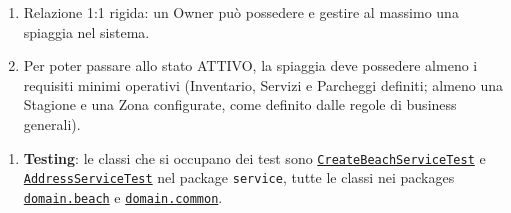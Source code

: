 {
	\begin{enumerate}[nosep, leftmargin=*]
		\item[•] Relazione 1:1 rigida: un Owner può possedere e gestire al massimo una spiaggia nel sistema.
		\item[•] Per poter passare allo stato ATTIVO, la spiaggia deve possedere almeno i requisiti minimi operativi (Inventario, Servizi e Parcheggi definiti; almeno una Stagione e una Zona configurate, come definito dalle regole di business generali).
	\end{enumerate}
	
	\begin{enumerate}[leftmargin=*]
		\item[•] \textbf{Testing}: le classi che si occupano dei test sono \hyperref[itm:application_beach]{\texttt{CreateBeachServiceTest}} e \hyperref[itm:application_common]{\texttt{AddressServiceTest}} nel package \texttt{service}, tutte le classi nei packages \hyperref[itm:domain_beach]{\texttt{domain.beach}} e \hyperref[itm:domain_beachsubclasses]{\texttt{domain.common}}.
	\end{enumerate}
}